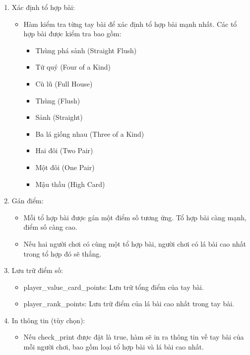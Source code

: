 \documentclass{article}
\begin{document}
\begin{itemize}
    \begin{description}
            \begin{enumerate}
            \item Xác định tổ hợp bài:
                \begin{itemize}
                    \item Hàm kiểm tra từng tay bài để xác định tổ hợp bài mạnh nhất. Các tổ hợp bài được kiểm tra bao gồm:
                    \begin{itemize}
                        \item Thùng phá sảnh (Straight Flush)
                        \item Tứ quý (Four of a Kind)
                        \item Cù lũ (Full House)
                        \item Thùng (Flush)
                        \item Sảnh (Straight)
                        \item Ba lá giống nhau (Three of a Kind)
                        \item Hai đôi (Two Pair)
                        \item Một đôi (One Pair)
                        \item  Mậu thầu (High Card)
                    \end{itemize}
                \end{itemize}
            \item Gán điểm:
                \begin{itemize}
                    \item Mỗi tổ hợp bài được gán một điểm số tương ứng. Tổ hợp bài càng mạnh, điểm số càng cao.
                    \item Nếu hai người chơi có cùng một tổ hợp bài, người chơi có lá bài cao nhất trong tổ hợp đó sẽ thắng.
                \end{itemize}
            \item Lưu trữ điểm số:
                \begin{itemize}
                    \item player\_value\_card\_points: Lưu trữ tổng điểm của tay bài.
                    \item player\_rank\_points: Lưu trữ điểm của lá bài cao nhất trong tay bài.
                \end{itemize}
            \item In thông tin (tùy chọn):
                \begin{itemize}
                    \item Nếu check\_print được đặt là true, hàm sẽ in ra thông tin về tay bài của mỗi người chơi, bao gồm loại tổ hợp bài và lá bài cao nhất.
                \end{itemize}
        \end{enumerate}
    \end{description}


\end{itemize}
\end{document}
